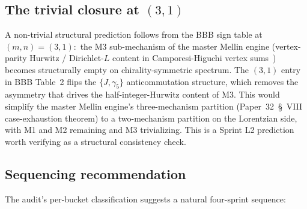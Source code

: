 \documentclass[twocolumn,pra,amsmath,amssymb,superscriptaddress]{revtex4-2}
\begin{document}
\subsection{The trivial closure at $(3, 1)$}
\label{sec:sig_trivial_closure}

A non-trivial structural prediction follows from the BBB sign table
at $(m, n) = (3, 1)$:\ the M3 sub-mechanism of the master Mellin
engine (vertex-parity Hurwitz / Dirichlet-$L$ content in
Camporesi-Higuchi vertex sums~\cite{paper28}) becomes structurally
empty on chirality-symmetric spectrum.  The $(3, 1)$ entry in
BBB Table~2 flips the $\{J, \gamma_5\}$ anticommutation structure,
which removes the asymmetry that drives the half-integer-Hurwitz
content of M3.  This would simplify the master Mellin engine's
three-mechanism partition (Paper~32~\S~VIII case-exhaustion theorem)
to a two-mechanism partition on the Lorentzian side, with M1 and M2
remaining and M3 trivializing.  This is a Sprint L2 prediction worth
verifying as a structural consistency check.

\subsection{Sequencing recommendation}
\label{sec:sig_sequencing}

The audit's per-bucket classification suggests a natural four-sprint
sequence:
\end{document}
